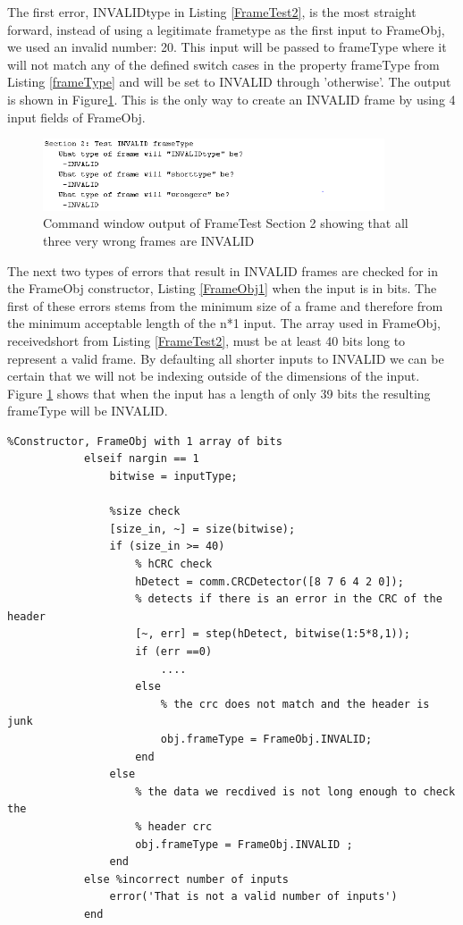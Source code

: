 The first error, INVALIDtype in Listing \ref{FrameTest2}, is the most straight forward, instead of using a legitimate frametype as the first input to FrameObj, we used an invalid number: 20. This input will be passed to frameType where it will not match any of the defined switch cases in the property frameType from Listing \ref{frameType} and will be set to INVALID through 'otherwise'. The output is shown in Figure\ref{fig:FrameTest2}.  This is the only way to create an INVALID frame by using 4 input fields of FrameObj. 

\begin{figure}[h]
    \includegraphics[width=0.9\textwidth, left]{FrameTest2.PNG}
    \caption{Command window output of FrameTest Section 2 showing that all three very wrong frames are INVALID }
    \label{fig:FrameTest2}
\end{figure}

The next two types of errors that result in INVALID frames are checked for in the FrameObj constructor, Listing \ref{FrameObj1} when the input is in bits. The first of these errors stems from the minimum size of a frame and therefore from the minimum acceptable length of the n*1 input. The array used in FrameObj, receivedshort from Listing \ref{FrameTest2},  must be at least 40 bits long to represent a valid frame. By defaulting all shorter inputs to INVALID we can be certain that we will not be indexing outside of the dimensions of the input. Figure \ref{fig:FrameTest2} shows that when the input has a length of only 39 bits the resulting frameType will be INVALID. 

\begin{lstlisting} 
%Constructor, FrameObj with 1 array of bits
            elseif nargin == 1
                bitwise = inputType;
                 
                %size check
                [size_in, ~] = size(bitwise);
                if (size_in >= 40)
                    % hCRC check
                    hDetect = comm.CRCDetector([8 7 6 4 2 0]);
                    % detects if there is an error in the CRC of the header
                    [~, err] = step(hDetect, bitwise(1:5*8,1));
                    if (err ==0)
						....
                    else
                        % the crc does not match and the header is junk
                        obj.frameType = FrameObj.INVALID;
                    end
                else
                    % the data we recdived is not long enough to check the
                    % header crc
                    obj.frameType = FrameObj.INVALID ;     
                end
            else %incorrect number of inputs
                error('That is not a valid number of inputs')
            end
\end{lstlisting} 

